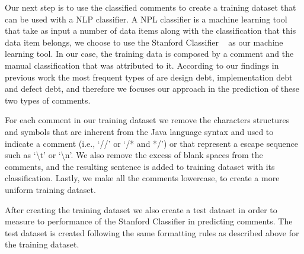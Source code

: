 
Our next step is to use the classified \SATD comments to create a training dataset that can be used with a NLP classifier. A NPL classifier is a machine learning tool that take as input a number of data items along with the classification that this data item belongs, we choose to use the Stanford Classifier ~\cite{Manning2014ACL} as our machine learning tool. In our case, the training data is composed by a comment and the manual classification that was attributed to it. According to our findings in previous work \cite{Maldonado2015MTD} the most frequent types of \SATD are design debt, implementation debt and defect debt, and therefore we focuses our approach in the prediction of these two types of \SATD comments.

For each comment in our training dataset we remove the characters structures and symbols that are inherent from the Java language syntax and used to indicate a comment (i.e., `//' or `/* and */') or that represent a escape sequence such as `\textbackslash t' or `\textbackslash n'. We also remove the excess of blank spaces from the comments, and the resulting sentence is added to training dataset with its classification. Lastly, we make all the comments lowercase, to create a more uniform training dataset.  

After creating the training dataset we also create a test dataset in order to measure to performance of the Stanford Classifier in predicting \SATD comments. The test dataset is created following the same formatting rules as described above for the training dataset. 

